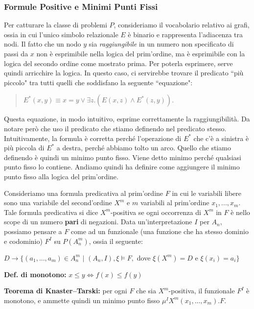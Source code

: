 \documentclass{article}
\begin{document}
\subsubsection{Formule Positive e Minimi Punti Fissi}
Per catturare la classe di problemi $P$, consideriamo il vocabolario relativo ai grafi, ossia in cui l'unico simbolo relazionale $E$ è binario e rappresenta l'adiacenza tra nodi. Il fatto che un nodo $y$ sia \textit{raggiungibile} in un numero non specificato di passi da $x$ non è esprimibile nella logica del prim'ordine, ma è esprimibile con la logica del secondo ordine come mostrato prima. Per poterla esprimere, serve quindi arricchire la logica. In questo caso, ci servirebbe trovare il predicato ``più piccolo" tra tutti quelli che soddisfano la seguente ``equazione":
\begin{quote}
    $E^*(x,y)\equiv x=y\lor\exists z.(E(x,z)\land E^*(z,y))$.
\end{quote}

Questa equazione, in modo intuitivo, esprime correttamente la raggiungibilità. Da notare però che uso il predicato che stiamo definendo nel predicato stesso. Intuitivamente, la formula è corretta perché l'operazione di $E^*$ che c'è a sinistra è più piccola di $E^*$ a destra, perché abbiamo tolto un arco. Quello che stiamo definendo è quindi un minimo punto fisso. Viene detto minimo perché qualsiasi punto fisso lo contiene. Andiamo quindi ha definire come aggiungere il minimo punto fisso alla logica del prim'ordine.

\bigskip

Consideriamo una formula predicativa al prim'ordine $F$ in cui le variabili libere sono una variabile del second'ordine $X^m$ e $m$ variabili al prim'ordine $x_1,...,x_m$. Tale formula predicativa si dice $X^m$-positiva se ogni occorrenza di $X^m$ in $F$ è nello scope di un numero \textbf{pari} di negazioni. Data un'interpretazione $I$ per $A_n$, possiamo pensare a $F$ come ad un funzionale (una funzione che ha stesso dominio e codominio) $F^I$ su $P(A_n^m)$, ossia il seguente:

$D\to\{(a_1,...,a_m)\in A_n^m\,\,|\,\,(A_n,I),\xi\vDash F,$ dove $\xi(X^m)= D$ e $\xi(x_i)=a_i\}$

\bigskip

\textbf{Def. di monotono:} $x\leq y \iff f(x) \leq f(y)$

\bigskip

\textbf{Teorema di Knaster–Tarski:} per ogni $F$ che sia $X^m$-positiva, il funzionale $F^I$ è monotono, e ammette quindi un minimo punto fisso $\mu^IX^m(x_1,...,x_m).F$.
\end{document}
